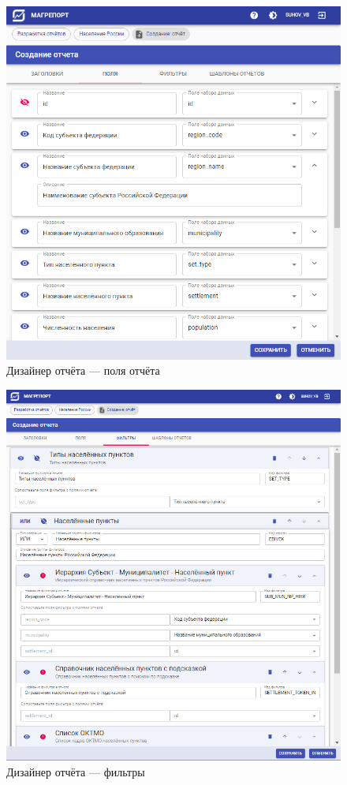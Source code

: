 \documentclass[../user-manual.tex]{subfiles}
\begin{document}
	\begin{figure}[h]
		\centering
		\includegraphics[width=\graphicswidth]{img/6-create-report-fields.png}
		\caption{Дизайнер отчёта --- поля отчёта}
		\label{fig:create-report-fields}
	\end{figure}

	\begin{figure}[h]
		\centering
		\includegraphics[width=\graphicswidth]{img/7-create-report-filters.png}
		\caption{Дизайнер отчёта --- фильтры}
		\label{fig:create-report-filters}
	\end{figure}
\end{document}
